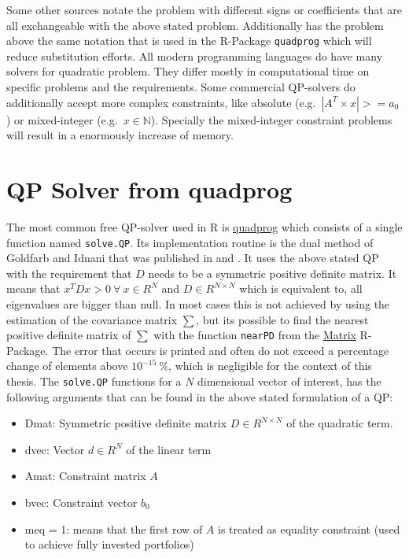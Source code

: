 \documentclass[
  oneside]{book}
\providecommand{\tightlist}{%
  \setlength{\itemsep}{0pt}\setlength{\parskip}{0pt}}
\begin{document}
Some other sources notate the problem with different signs or coefficients that are all exchangeable with the above stated problem. Additionally has the problem above the same notation that is used in the R-Package \texttt{quadprog} which will reduce substitution efforts. All modern programming languages do have many solvers for quadratic problem. They differ mostly in computational time on specific problems and the requirements. Some commercial QP-solvers do additionally accept more complex constraints, like absolute (e.g.~\(|A^T \times x| >= a_0\)) or mixed-integer (e.g.~\(x \in \mathbb{N}\)). Specially the mixed-integer constraint problems will result in a enormously increase of memory.

\hypertarget{qp-solver-from-quadprog}{%
\section{QP Solver from quadprog}\label{qp-solver-from-quadprog}}

The most common free QP-solver used in R is \href{https://cran.r-project.org/web/packages/quadprog/quadprog.pdf}{quadprog} which consists of a single function named \texttt{solve.QP}. Its implementation routine is the dual method of Goldfarb and Idnani that was published in \citep{GoId1982} and \citep{GoId1983}. It uses the above stated QP with the requirement that \(D\) needs to be a symmetric positive definite matrix. It means that \(x^T D x > 0 \ \forall \ x \in R^N\) and \(D\in R^{N \times N}\) which is equivalent to, all eigenvalues are bigger than null. In most cases this is not achieved by using the estimation of the covariance matrix \(\sum\), but its possible to find the nearest positive definite matrix of \(\sum\) with the function \texttt{nearPD} from the \href{https://cran.r-project.org/web/packages/Matrix/Matrix.pdf}{Matrix} R-Package. The error that occurs is printed and often do not exceed a percentage change of elements above \(10^{-15} \ \%\), which is negligible for the context of this thesis. The \texttt{solve.QP} functions for a \(N\) dimensional vector of interest, has the following arguments that can be found in the above stated formulation of a QP:

\begin{itemize}
\tightlist
\item
  Dmat: Symmetric positive definite matrix \(D \in R^{N \times N}\) of the quadratic term.
\item
  dvec: Vector \(d \in R^{N}\) of the linear term
\item
  Amat: Constraint matrix \(A\)
\item
  bvec: Constraint vector \(b_0\)
\item
  meq = 1: means that the first row of \(A\) is treated as equality constraint (used to achieve fully invested portfolios)
\end{itemize}
\end{document}
